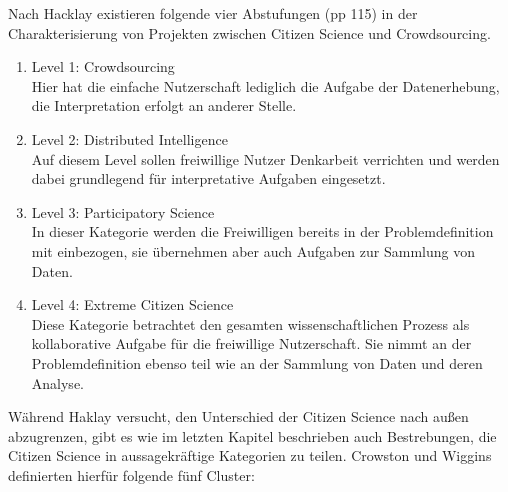 \documentclass{article}
\begin{document}
Nach Hacklay existieren folgende vier Abstufungen\cite{Haklay} (pp 115) in der Charakterisierung von Projekten zwischen Citizen Science und Crowdsourcing.
\begin{enumerate}
\item{Level 1: Crowdsourcing\\
Hier hat die einfache Nutzerschaft lediglich die Aufgabe der Datenerhebung, die Interpretation erfolgt an anderer Stelle.}
\item{Level 2: Distributed Intelligence\\
Auf diesem Level sollen freiwillige Nutzer Denkarbeit verrichten und werden dabei grundlegend für interpretative Aufgaben eingesetzt.}
\item{Level 3: Participatory Science\\
In dieser Kategorie werden die Freiwilligen bereits in der Problemdefinition mit einbezogen, sie übernehmen aber auch Aufgaben zur Sammlung von Daten.}
\item{Level 4: Extreme Citizen Science\\
Diese Kategorie betrachtet den gesamten wissenschaftlichen Prozess als kollaborative Aufgabe für die freiwillige Nutzerschaft.
Sie nimmt an der Problemdefinition ebenso teil wie an der Sammlung von Daten und deren Analyse.}
\end{enumerate}
Während Haklay versucht, den Unterschied der Citizen Science nach außen abzugrenzen, gibt es wie im letzten Kapitel beschrieben auch 
Bestrebungen, die Citizen Science in aussagekräftige Kategorien zu teilen. Crowston und Wiggins definierten hierfür folgende fünf Cluster: 
\end{document}
